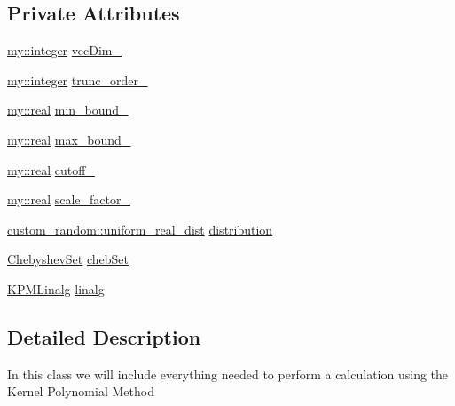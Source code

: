 \subsection*{Private Attributes}
\begin{DoxyCompactItemize}
\item 
\hyperlink{namespacemy_a42365393c537edae1e89d20ff90d1923}{my\+::integer} \hyperlink{classKpm_a1e10bd6603531a6a224863e2ff15dfb4}{vec\+Dim\+\_\+}
\item 
\hyperlink{namespacemy_a42365393c537edae1e89d20ff90d1923}{my\+::integer} \hyperlink{classKpm_a453f8863ff6bda11edbe656e5f2aa696}{trunc\+\_\+order\+\_\+}
\item 
\hyperlink{namespacemy_ad61baeaeda728a4c48dd64f93e44a46c}{my\+::real} \hyperlink{classKpm_aec9beedeb9a63d641f95ac3751f6d2e4}{min\+\_\+bound\+\_\+}
\item 
\hyperlink{namespacemy_ad61baeaeda728a4c48dd64f93e44a46c}{my\+::real} \hyperlink{classKpm_a6d5c5171fb621c644228c8929beabd24}{max\+\_\+bound\+\_\+}
\item 
\hyperlink{namespacemy_ad61baeaeda728a4c48dd64f93e44a46c}{my\+::real} \hyperlink{classKpm_abc651c7281a9b6d2ed5b1c0796e3f62b}{cutoff\+\_\+}
\item 
\hyperlink{namespacemy_ad61baeaeda728a4c48dd64f93e44a46c}{my\+::real} \hyperlink{classKpm_ab46902d3fd0d00386c373d38cf33e164}{scale\+\_\+factor\+\_\+}
\item 
\hyperlink{namespacecustom__random_aabaaf85a6342ff33004ff1ba5eaf9014}{custom\+\_\+random\+::uniform\+\_\+real\+\_\+dist} \hyperlink{classKpm_ad729944f0ddd8d19e93071980fe4c3e7}{distribution}
\item 
\hyperlink{classChebyshevSet}{Chebyshev\+Set} \hyperlink{classKpm_a0386ba4d55d9d49365ca0c180b802674}{cheb\+Set}
\item 
\hyperlink{classKPMLinalg}{K\+P\+M\+Linalg} \hyperlink{classKpm_af0a93d02c795e789be2aeeb2e268fa79}{linalg}
\end{DoxyCompactItemize}


\subsection{Detailed Description}
In this class we will include everything needed to perform a calculation using the Kernel Polynomial Method 

